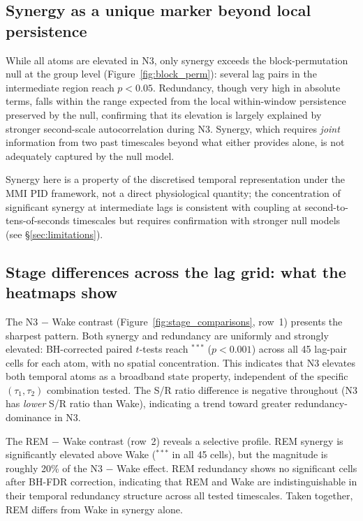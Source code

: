 \documentclass[11pt,a4paper]{article}
\begin{document}
\subsection{Synergy as a unique marker beyond local persistence}

While all atoms are elevated in N3, only synergy exceeds the
block-permutation null at the group level
(Figure~\ref{fig:block_perm}): several lag pairs in the intermediate
region reach $p < 0.05$.  Redundancy, though very high in absolute terms,
falls within the range expected from the local within-window persistence
preserved by the null, confirming that its elevation is largely explained
by stronger second-scale autocorrelation during N3.  Synergy, which
requires \emph{joint} information from two past timescales beyond what
either provides alone, is not adequately captured by the null model.

Synergy here is a property of the discretised temporal representation
under the MMI PID framework, not a direct physiological quantity; the
concentration of significant synergy at intermediate lags is consistent
with coupling at second-to-tens-of-seconds timescales but requires
confirmation with stronger null models (see \S\ref{sec:limitations}).

\subsection{Stage differences across the lag grid: what the heatmaps show}

The N3 $-$ Wake contrast (Figure~\ref{fig:stage_comparisons}, row~1)
presents the sharpest pattern.  Both synergy and redundancy are uniformly
and strongly elevated: BH-corrected paired $t$-tests reach $^{***}$
($p < 0.001$) across all 45 lag-pair cells for each atom, with no spatial
concentration.  This indicates that N3 elevates both temporal atoms as a
broadband state property, independent of the specific
$(\tau_1, \tau_2)$ combination tested.  The S/R ratio difference is
negative throughout (N3 has \emph{lower} S/R ratio than Wake), indicating
a trend toward greater redundancy-dominance in N3.

The REM $-$ Wake contrast (row~2) reveals a selective profile.  REM
synergy is significantly elevated above Wake ($^{***}$ in all 45 cells),
but the magnitude is roughly 20\% of the N3 $-$ Wake effect.  REM
redundancy shows no significant cells after BH-FDR correction, indicating
that REM and Wake are indistinguishable in their temporal redundancy
structure across all tested timescales.  Taken together, REM differs from
Wake in synergy alone.
\end{document}

